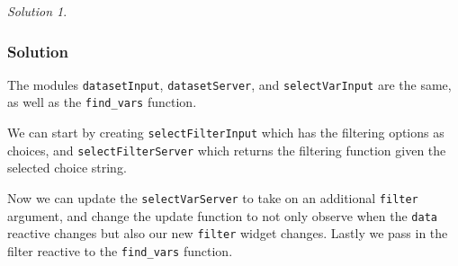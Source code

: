 \documentclass[
]{book}
\newenvironment{Shaded}{\begin{snugshade}}{\end{snugshade}}
\newcommand{\AttributeTok}[1]{\textcolor[rgb]{0.77,0.63,0.00}{#1}}
\newcommand{\CommentTok}[1]{\textcolor[rgb]{0.56,0.35,0.01}{\textit{#1}}}
\newcommand{\ControlFlowTok}[1]{\textcolor[rgb]{0.13,0.29,0.53}{\textbf{#1}}}
\newcommand{\FunctionTok}[1]{\textcolor[rgb]{0.00,0.00,0.00}{#1}}
\newcommand{\NormalTok}[1]{#1}
\newcommand{\OtherTok}[1]{\textcolor[rgb]{0.56,0.35,0.01}{#1}}
\newcommand{\SpecialCharTok}[1]{\textcolor[rgb]{0.00,0.00,0.00}{#1}}
\newcommand{\StringTok}[1]{\textcolor[rgb]{0.31,0.60,0.02}{#1}}
\theoremstyle{definition}
\theoremstyle{definition}
\theoremstyle{definition}
\theoremstyle{definition}
\theoremstyle{remark}
\newtheorem*{solution}{Solution}
\begin{document}
\begin{solution}
\leavevmode

\hypertarget{solution-47}{%
\subsubsection*{Solution}\label{solution-47}}

The modules \texttt{datasetInput}, \texttt{datasetServer}, and \texttt{selectVarInput} are the same, as well as the \texttt{find\_vars} function.

We can start by creating \texttt{selectFilterInput} which has the filtering options as choices, and \texttt{selectFilterServer} which returns the filtering function given the selected choice string.

\begin{Shaded}
\end{Shaded}

Now we can update the \texttt{selectVarServer} to take on an additional \texttt{filter} argument, and change the update function to not only observe when the \texttt{data} reactive changes but also our new \texttt{filter} widget changes. Lastly we pass in the filter reactive to the \texttt{find\_vars} function.


\end{solution}
\end{document}

